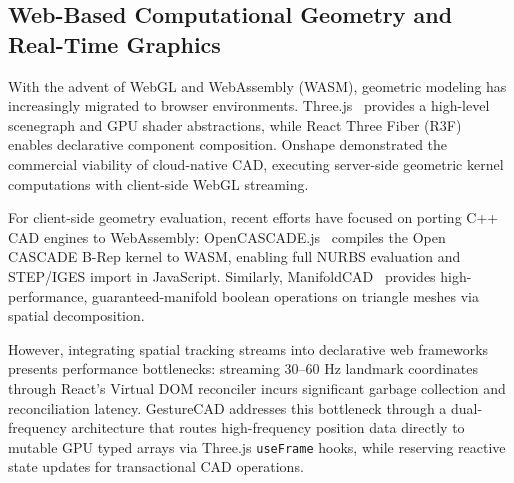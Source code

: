 \subsection{Web-Based Computational Geometry and Real-Time Graphics}
With the advent of WebGL and WebAssembly (WASM), geometric modeling has increasingly migrated to browser environments. Three.js~\cite{threejs} provides a high-level scenegraph and GPU shader abstractions, while React Three Fiber (R3F)~\cite{r3f} enables declarative component composition. Onshape demonstrated the commercial viability of cloud-native CAD, executing server-side geometric kernel computations with client-side WebGL streaming.

For client-side geometry evaluation, recent efforts have focused on porting C++ CAD engines to WebAssembly: OpenCASCADE.js~\cite{opencascadejs} compiles the Open CASCADE B-Rep kernel to WASM, enabling full NURBS evaluation and STEP/IGES import in JavaScript. Similarly, ManifoldCAD~\cite{manifoldcad} provides high-performance, guaranteed-manifold boolean operations on triangle meshes via spatial decomposition. 

However, integrating spatial tracking streams into declarative web frameworks presents performance bottlenecks: streaming 30--60 Hz landmark coordinates through React's Virtual DOM reconciler incurs significant garbage collection and reconciliation latency. GestureCAD addresses this bottleneck through a dual-frequency architecture that routes high-frequency position data directly to mutable GPU typed arrays via Three.js \texttt{useFrame} hooks, while reserving reactive state updates for transactional CAD operations.

